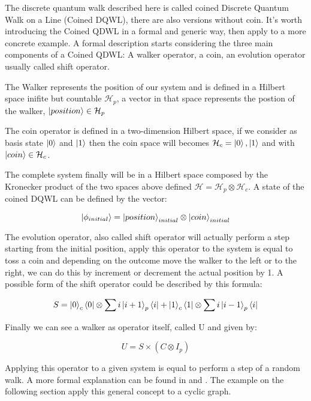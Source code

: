 The discrete quantum walk described here is called coined Discrete Quantum Walk on a Line (Coined DQWL), there are also versions without coin. It's worth introducing
the Coined QDWL in a formal and generic way, then apply to a more concrete example. A formal description starts considering the three main components of a Coined QDWL: 
A walker operator, a coin, an evolution operator usually called shift operator. 

The Walker represents the position of our system and is defined in a Hilbert space inifite but countable $\mathcal{H}_{p}$, a vector in that space represents 
the postion of the walker, $\ket{position} \in \mathcal{H}_{p}$ 

The coin operator is defined in a two-dimension Hilbert space, if we consider as basis state $\ket{0}$ and $\ket{1}$ then the coin space will becomes
$\mathcal{H}_{c} = { \ket{0}, \ket{1} }$ and with $\ket{coin} \in \mathcal{H}_{c}$.

The complete system finally will be in a Hilbert space composed by the Kronecker product of the two spaces above defined 
$\mathcal{H}=\mathcal{H}_{p}\otimes\mathcal{H}_{c}$. A state of the coined DQWL can be defined by the vector:

\begin{equation}
    \ket{\phi_{initial}} = \ket{position}_{initial} \otimes \ket{coin}_{initial}
\end{equation}

The evolution operator, also called shift operator will actually perform a step starting from the initial position, apply this operator to the
system is equal to toss a coin and depending on the outcome move the walker to the left or to the right, we can do this by increment or decrement
the actual position by 1. A possible form of the shift operator could be described by this formula:

\begin{equation}
    S = \ket{0}_{c} \bra{0} \otimes \sum{i} \ket{i + 1}_{p} \bra{i} + \ket{1}_{c} \bra{1} \otimes \sum{i} \ket{i - 1}_{p} \bra{i} 
\end{equation}

Finally we can see a walker as operator itself, called U and given by:

\begin{equation}
    U = S \times (C \otimes I_{p})
\end{equation}

Applying this operator to a given system is equal to perform a step of a random walk. A more formal explanation can be found in \cite{6812670} and \cite{Kempe_2003}.
The example on the following section apply this general concept to a cyclic graph.





